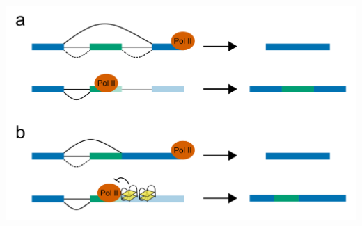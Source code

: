 \documentclass[12pt,a4paper,]{report}
\let\origfigure=\figure
\let\endorigfigure=\endfigure
\renewenvironment{figure}[1][2] {
    \expandafter\origfigure\expandafter[H]
} {
    \endorigfigure
}
\begin{document}
\newpage

\begin{figure}[htbp]
\centering
\includegraphics[width=\textwidth,height=562pt,keepaspectratio]{chapter_6/figures/polii_speed_splicing.png}
\caption[Pol II elongation speed affects co-transcriptional splicing]{\textbf{Pol   II   elongation   speed   affects   co-transcriptional   splicing}   \textbf{a)}   Mechanism   for   effect   of   Pol   II   speed   on   co-transcriptional   splicing:   when   elongation   occurs   rapidly   (first   row),   the   more   canonical   but   distal   acceptor   site   is   used,   resulting   in   the   exclusion   of   the   alternate   exon   (shown   in   green).   When   Pol   II   elongates   more   slowly   (second   row),   there   is   more   time   for   the   weaker   proximal   site   to   be   utilised,   resulting   in   the   inclusion   of   the   alternate   exon.   \textbf{b)}   Example   mechanism   for   how   G4s   could   affect   splicing.   When   G4s   are   not   present   (top   row),   the   constitutive   splice   acceptor   is   used   and   the   green   exonic   chunk   is   excluded.   When   G4s   are   formed   in   the   template   strand   of   the   DNA   (second   row),   these   slow   down   Pol   II   elongation,   allowing   the   weaker   proximal   splice   junction   to   be   utilised,   and   including   the   alternate   exon   chunk.   \label{speed_splice}}
\end{figure}
\end{document}
